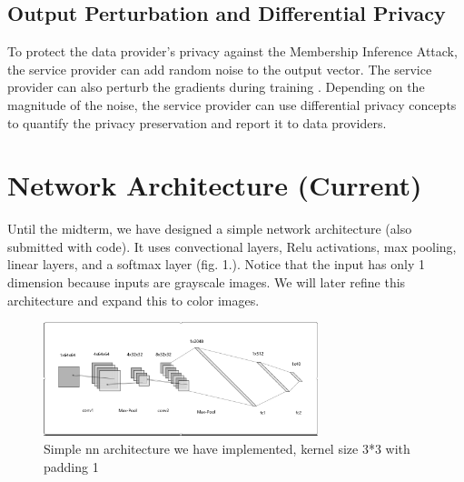 \documentclass[conference]{IEEEtran}
\begin{document}
\subsection{Output Perturbation and Differential Privacy}
To protect the data provider's privacy against the Membership Inference Attack, the service provider can add random noise to the output vector. The service provider can also perturb the gradients during training \cite{b14}. Depending on the magnitude of the noise, the service provider can use differential privacy concepts to quantify the privacy preservation and report it to data providers.

\section{Network Architecture (Current)}
Until the midterm, we have designed a simple network architecture (also submitted with code). It uses convectional layers, Relu activations, max pooling, linear layers, and a softmax layer (fig. 1.).  Notice that the input has only 1 dimension because inputs are grayscale images. We will later refine this architecture and expand this to color images.
\begin{figure}[htbp]
\centerline{\includegraphics[width=80mm]{architecture.png}}
\caption{Simple nn architecture we have implemented, kernel size 3*3 with padding 1}
\label{fig}
\end{figure}
\end{document}
